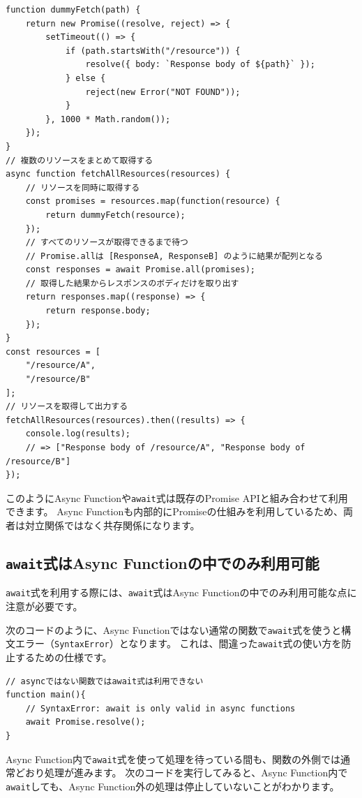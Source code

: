 \begin{lstlisting}
function dummyFetch(path) {
    return new Promise((resolve, reject) => {
        setTimeout(() => {
            if (path.startsWith("/resource")) {
                resolve({ body: `Response body of ${path}` });
            } else {
                reject(new Error("NOT FOUND"));
            }
        }, 1000 * Math.random());
    });
}
// 複数のリソースをまとめて取得する
async function fetchAllResources(resources) {
    // リソースを同時に取得する
    const promises = resources.map(function(resource) {
        return dummyFetch(resource);
    });
    // すべてのリソースが取得できるまで待つ
    // Promise.allは [ResponseA, ResponseB] のように結果が配列となる
    const responses = await Promise.all(promises);
    // 取得した結果からレスポンスのボディだけを取り出す
    return responses.map((response) => {
        return response.body;
    });
}
const resources = [
    "/resource/A",
    "/resource/B"
];
// リソースを取得して出力する
fetchAllResources(resources).then((results) => {
    console.log(results); 
    // => ["Response body of /resource/A", "Response body of /resource/B"]
});
\end{lstlisting}

このようにAsync
Functionや\texttt{await}式は既存のPromise
APIと組み合わせて利用できます。 Async
Functionも内部的にPromiseの仕組みを利用しているため、両者は対立関係ではなく共存関係になります。

\hypertarget{await-in-async-function}{%
\subsection{\texorpdfstring{\texttt{await}式はAsync
Functionの中でのみ利用可能}{await式はAsync Functionの中でのみ利用可能}}\label{await-in-async-function}}

\texttt{await}式を利用する際には、\texttt{await}式はAsync
Functionの中でのみ利用可能な点に注意が必要です。

次のコードのように、Async
Functionではない通常の関数で\texttt{await}式を使うと構文エラー（\texttt{SyntaxError}）となります。
これは、間違った\texttt{await}式の使い方を防止するための仕様です。

\begin{lstlisting}
// asyncではない関数ではawait式は利用できない
function main(){
    // SyntaxError: await is only valid in async functions
    await Promise.resolve();
}
\end{lstlisting}

Async
Function内で\texttt{await}式を使って処理を待っている間も、関数の外側では通常どおり処理が進みます。
次のコードを実行してみると、Async
Function内で\texttt{await}しても、Async
Function外の処理は停止していないことがわかります。

